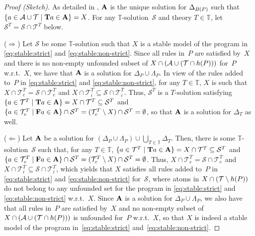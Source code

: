 \begin{proof}[Proof (Sketch)]
As detailed in \cite[Lemma 3.1]{gekasc09c}, $\mathbf{A}$ is the unique solution
for $\Delta_{B(P)}$ such that $\{a\in\mathcal{A}\cup\mathcal{T}\mid\mathbf{T} a\in\mathbf{A}\}=X$.
For any $\mathbb{T}$-solution~$\mathcal{S}$ and theory $T\in\mathbb{T}$,
let $\mathcal{S}^T=\mathcal{S}\cap\mathcal{T}^T$ below.

($\Rightarrow$)
Let $\mathcal{S}$ be some $\mathbb{T}$-solution such that $X$ is a stable model
of the program in \eqref{eq:stable:strict} and \eqref{eq:stable:non-strict}.
Since all rules in~$P$ are satisfied by~$X$ and there is no non-empty unfounded subset of
$X\cap(\mathcal{A}\cup(\mathcal{T}\cap h(P)))$ for~$P$ w.r.t.~$X$,
we have that $\mathbf{A}$ is a solution for $\Delta_P\cup\Lambda_P$.
In view of the rules added to~$P$ in \eqref{eq:stable:strict} and \eqref{eq:stable:non-strict},
for any $T\in\mathbb{T}$,
$X$ is such that
$X\cap \mathcal{T}^T_e=\mathcal{S}\cap\mathcal{T}^T_e$ and
$X\cap \mathcal{T}^T_i\subseteq\mathcal{S}\cap\mathcal{T}^T_i$.
Thus,
$\mathcal{S}^T$ is a $T$-solution satisfying
$\{a\in\mathcal{T}^T\mid\Tlit{a}\in\nolinebreak\Ass\}=X\cap \mathcal{T}^T\subseteq\mathcal{S}^T$ and
$\{a\in\mathcal{T}^T_e\mid\Flit{a}\in\nolinebreak\Ass\}\cap\mathcal{S}^T=(\mathcal{T}^T_e\setminus X)\cap \mathcal{S}^T=\emptyset$,
so that $\mathbf{A}$ is a solution for $\Delta_T$ as well.

($\Leftarrow$)
Let $\mathbf{A}$ be a solution for $(\Delta_P\cup\Lambda_P)\cup\bigcup_{T\in\mathbb{T}}\Delta_T$.
Then, there is some $\mathbb{T}$-solution~$\mathcal{S}$ such that, for any $T\in\mathbb{T}$,
$\{a\in\mathcal{T}^T\mid\Tlit{a}\in\nolinebreak\Ass\}=X\cap \mathcal{T}^T\subseteq\mathcal{S}^T$ and
$\{a\in\mathcal{T}^T_e\mid\Flit{a}\in\nolinebreak\Ass\}\cap\mathcal{S}^T=(\mathcal{T}^T_e\setminus X)\cap \mathcal{S}^T=\emptyset$.
Thus,
$X\cap \mathcal{T}^T_e=\mathcal{S}\cap\mathcal{T}^T_e$ and
$X\cap \mathcal{T}^T_i\subseteq\mathcal{S}\cap\mathcal{T}^T_i$,
which yields that $X$ satisfies all rules added to~$P$
in \eqref{eq:stable:strict} and \eqref{eq:stable:non-strict} for~$\mathcal{S}$,
where
atoms in $X\cap(\mathcal{T}\setminus h(P))$ do not belong to any unfounded set
for the program in \eqref{eq:stable:strict} and \eqref{eq:stable:non-strict} w.r.t.~$X$.
Since $\mathbf{A}$ is a solution for $\Delta_P\cup\Lambda_P$, we also have that
all rules in~$P$ are satisfied by~$X$ and no non-empty subset of
$X\cap(\mathcal{A}\cup(\mathcal{T}\cap h(P)))$ is unfounded for~$P$ w.r.t.~$X$,
so that $X$ is indeed a stable model of the program in~\eqref{eq:stable:strict} and~\eqref{eq:stable:non-strict}.%
\end{proof}

